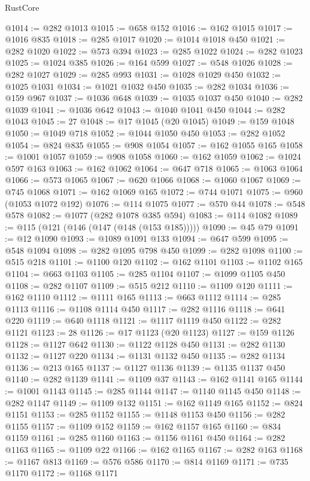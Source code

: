 \begin{lexlean}{RustCore}
\begin{coremodule}
@1014 := @282 @1013
@1015 := @658 @152
@1016 := @162 @1015
@1017 := @1016 @835
@1018 := @285 @1017
@1020 := @1014 @1018 @450
@1021 := @282 @1020
@1022 := @573 @394
@1023 := @285 @1022
@1024 := @282 @1023
@1025 := @1024 @385
@1026 := @164 @599
@1027 := @548 @1026
@1028 := @282 @1027
@1029 := @285 @993
@1031 := @1028 @1029 @450
@1032 := @1025 @1031
@1034 := @1021 @1032 @450
@1035 := @282 @1034
@1036 := @159 @967
@1037 := @1036 @648
@1039 := @1035 @1037 @450
@1040 := @282 @1039
@1041 := @1036 @642
@1043 := @1040 @1041 @450
@1044 := @282 @1043
@1045 := 27
@1048 := @17 @1045 (@20 @1045)
@1049 := @159 @1048
@1050 := @1049 @718
@1052 := @1044 @1050 @450
@1053 := @282 @1052
@1054 := @824 @835
@1055 := @908 @1054
@1057 := @162 @1055 @165
@1058 := @1001 @1057
@1059 := @908 @1058
@1060 := @162 @1059
@1062 := @1024 @597 @163
@1063 := @162 @1062
@1064 := @647 @718
@1065 := @1063 @1064
@1066 := @573 @1065
@1067 := @620 @1066
@1068 := @1060 @1067
@1069 := @745 @1068
@1071 := @162 @1069 @165
@1072 := @744 @1071
@1075 := @960 (@1053 @1072 @192)
@1076 := @114 @1075
@1077 := @570 @44
@1078 := @548 @578
@1082 := @1077 (@282 @1078 @385 @594)
@1083 := @114 @1082
@1089 := @115 (@121 (@146 (@147 (@148 (@153 @185)))))
@1090 := @45 @79
@1091 := @12 @1090
@1093 := @1089 @1091 @133
@1094 := @647 @599
@1095 := @548 @1094
@1098 := @282 @1095 @798 @450
@1099 := @282 @1098
@1100 := @515 @218
@1101 := @1100 @120
@1102 := @162 @1101
@1103 := @1102 @165
@1104 := @663 @1103
@1105 := @285 @1104
@1107 := @1099 @1105 @450
@1108 := @282 @1107
@1109 := @515 @212
@1110 := @1109 @120
@1111 := @162 @1110
@1112 := @1111 @165
@1113 := @663 @1112
@1114 := @285 @1113
@1116 := @1108 @1114 @450
@1117 := @282 @1116
@1118 := @641 @220
@1119 := @640 @1118
@1121 := @1117 @1119 @450
@1122 := @282 @1121
@1123 := 28
@1126 := @17 @1123 (@20 @1123)
@1127 := @159 @1126
@1128 := @1127 @642
@1130 := @1122 @1128 @450
@1131 := @282 @1130
@1132 := @1127 @220
@1134 := @1131 @1132 @450
@1135 := @282 @1134
@1136 := @213 @165
@1137 := @1127 @1136
@1139 := @1135 @1137 @450
@1140 := @282 @1139
@1141 := @1109 @37
@1143 := @162 @1141 @165
@1144 := @1001 @1143
@1145 := @285 @1144
@1147 := @1140 @1145 @450
@1148 := @282 @1147
@1149 := @1109 @132
@1151 := @162 @1149 @165
@1152 := @824 @1151
@1153 := @285 @1152
@1155 := @1148 @1153 @450
@1156 := @282 @1155
@1157 := @1109 @152
@1159 := @162 @1157 @165
@1160 := @834 @1159
@1161 := @285 @1160
@1163 := @1156 @1161 @450
@1164 := @282 @1163
@1165 := @1109 @22
@1166 := @162 @1165
@1167 := @282 @163
@1168 := @1167 @813
@1169 := @576 @586
@1170 := @814 @1169
@1171 := @735 @1170
@1172 := @1168 @1171

\end{coremodule}
\end{lexlean}
